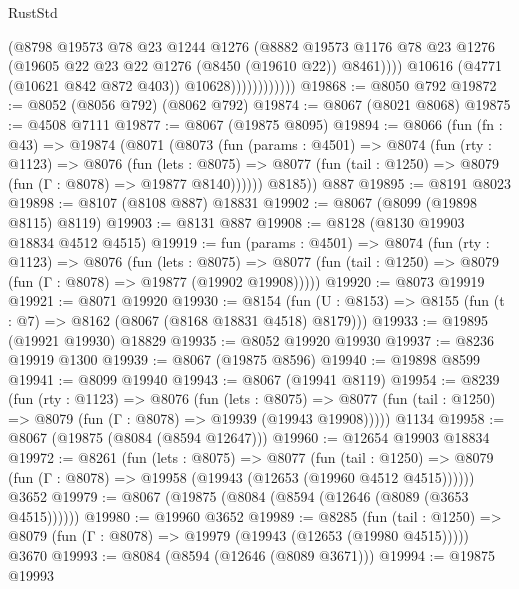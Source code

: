 \begin{lexlean}{RustStd}
\begin{coremodule}
                              (@8798
                                @19573
                                @78
                                @23
                                @1244
                                @1276
                                (@8882
                                  @19573
                                  @1176
                                  @78
                                  @23
                                  @1276
                                  (@19605 @22 @23 @22 @1276 (@8450 (@19610 @22)) @8461))))
                            @10616
                            (@4771 (@10621 @842 @872 @403))
                            @10628))))))))))))
@19868 := @8050 @792
@19872 := @8052 (@8056 @792) (@8062 @792)
@19874 := @8067 (@8021 @8068)
@19875 := @4508 @7111
@19877 := @8067 (@19875 @8095)
@19894 := @8066
    (fun (fn : @43) =>
    @19874
      (@8071
        (@8073
          (fun (params : @4501) =>
          @8074
            (fun (rty : @1123) =>
            @8076
              (fun (lets : @8075) =>
              @8077 (fun (tail : @1250) => @8079 (fun (Γ : @8078) => @19877 @8140))))))
        @8185))
    @887
@19895 := @8191 @8023
@19898 := @8107 (@8108 @887) @18831
@19902 := @8067 (@8099 (@19898 @8115) @8119)
@19903 := @8131 @887
@19908 := @8128 (@8130 @19903 @18834 @4512 @4515)
@19919 := fun (params : @4501) =>
  @8074
    (fun (rty : @1123) =>
    @8076
      (fun (lets : @8075) =>
      @8077 (fun (tail : @1250) => @8079 (fun (Γ : @8078) => @19877 (@19902 @19908)))))
@19920 := @8073 @19919
@19921 := @8071 @19920
@19930 := @8154
    (fun (U : @8153) => @8155 (fun (t : @7) => @8162 (@8067 (@8168 @18831 @4518) @8179)))
@19933 := @19895 (@19921 @19930) @18829
@19935 := @8052 @19920 @19930
@19937 := @8236 @19919 @1300
@19939 := @8067 (@19875 @8596)
@19940 := @19898 @8599
@19941 := @8099 @19940
@19943 := @8067 (@19941 @8119)
@19954 := @8239
    (fun (rty : @1123) =>
    @8076
      (fun (lets : @8075) =>
      @8077 (fun (tail : @1250) => @8079 (fun (Γ : @8078) => @19939 (@19943 @19908)))))
    @1134
@19958 := @8067 (@19875 (@8084 (@8594 @12647)))
@19960 := @12654 @19903 @18834
@19972 := @8261
    (fun (lets : @8075) =>
    @8077
      (fun (tail : @1250) =>
      @8079 (fun (Γ : @8078) => @19958 (@19943 (@12653 (@19960 @4512 @4515))))))
    @3652
@19979 := @8067 (@19875 (@8084 (@8594 (@12646 (@8089 (@3653 @4515))))))
@19980 := @19960 @3652
@19989 := @8285
    (fun (tail : @1250) => @8079 (fun (Γ : @8078) => @19979 (@19943 (@12653 (@19980 @4515)))))
    @3670
@19993 := @8084 (@8594 (@12646 (@8089 @3671)))
@19994 := @19875 @19993

\end{coremodule}
\end{lexlean}
